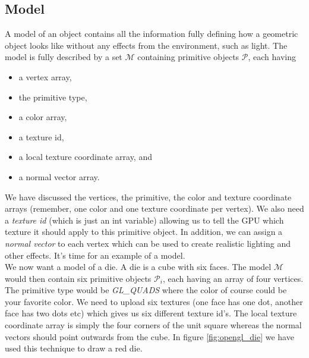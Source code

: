 \subsection{Model}
\label{sec:opengl_model}
A model of an object contains all the information fully defining how a geometric object looks like without any effects from the environment, such as light. The model is fully described by a set $\mathcal{M}$ containing primitive objects $\mathcal{P}$, each having 
\begin{itemize}
	\item a vertex array,
	\item the primitive type,
	\item a color array,
	\item a texture id,
	\item a local texture coordinate array, and
	\item a normal vector array.
\end{itemize}
We have discussed the vertices, the primitive, the color and texture coordinate arrays (remember, one color and one texture coordinate per vertex). We also need a \textit{texture id} (which is just an int variable) allowing us to tell the GPU which texture it should apply to this primitive object. In addition, we can assign a \textit{normal vector} to each vertex which can be used to create realistic lighting and other effects. It's time for an example of a model.\\
We now want a model of a die. A die is a cube with six faces. The model $\mathcal M$ would then contain six primitive objects $\mathcal P_i$, each having an array of four vertices. The primitive type would be \textit{GL\_QUADS} where the color of course could be your favorite color. We need to upload six textures (one face has one dot, another face has two dots etc) which gives us six different texture id's. The local texture coordinate array is simply the four corners of the unit square whereas the normal vectors should point outwards from the cube. In figure \ref{fig:opengl_die} we have used this technique to draw a red die.
